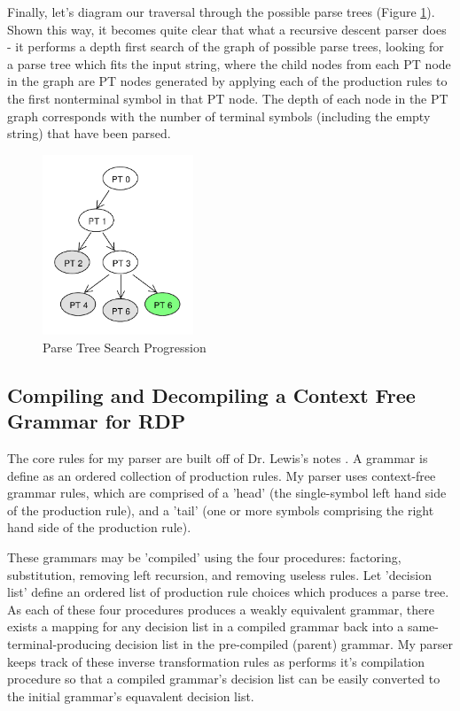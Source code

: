 \documentclass[11pt]{article}
\begin{document}
Finally, let's diagram our traversal through the possible parse trees (Figure \ref{fig:rdp_7}). Shown this way, it becomes quite
clear that what a recursive descent parser does - it performs a depth first search of the graph of possible parse trees, looking
for a parse tree which fits the input string, where the child nodes from each PT node in the graph are PT nodes generated by
applying each of the production rules to the first nonterminal symbol in that PT node. The depth of each node in the PT graph
corresponds with the number of terminal symbols (including the empty string) that have been parsed.

\begin{figure}[h!]
    \centering
    \includegraphics[width=0.4\textwidth,natwidth=30,natheight=30]{rdp_7.pdf}
    \caption{Parse Tree Search Progression}
    \label{fig:rdp_7}
\end{figure}

\clearpage

\subsection{Compiling and Decompiling a Context Free Grammar for RDP}
The core rules for my parser are built off of Dr. Lewis's notes \cite{lewis}.
A grammar is define as an ordered collection of production rules.
My parser uses context-free grammar rules, which are comprised of a
'head' (the single-symbol left hand side of the production rule), and a 'tail'
(one or more symbols comprising the right hand side of the production rule).

These grammars may be 'compiled' using the four procedures:
factoring, substitution, removing left recursion, and removing useless
rules. Let 'decision list' define an ordered list of production rule
choices which produces a parse tree.
As each of these four procedures produces a weakly equivalent grammar,
there exists a mapping for any decision list in a compiled grammar
back into a same-terminal-producing decision list in the pre-compiled (parent) grammar.
My parser keeps track of these inverse transformation rules as performs
it's compilation procedure so that a compiled grammar's decision list can be easily
converted to the initial grammar's equavalent decision list. 
\end{document}
